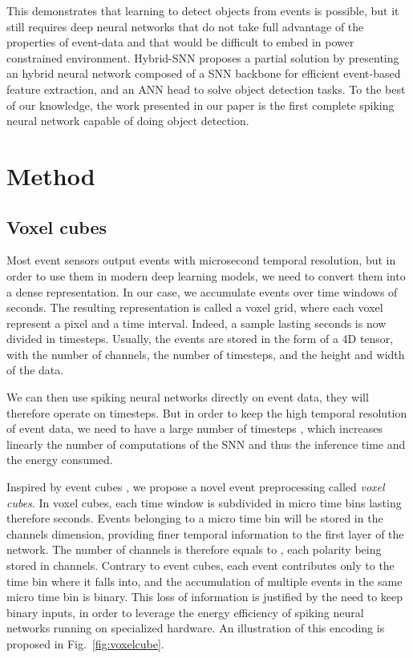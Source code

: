 \documentclass[conference]{IEEEtran}
\begin{document}
This demonstrates that learning to detect objects from events is possible, but it still requires deep neural networks that do not take full advantage of the properties of event-data and that would be difficult to embed in power constrained environment. Hybrid-SNN \cite{hybridsnn} proposes a partial solution by presenting an hybrid neural network composed of a SNN backbone for efficient event-based feature extraction, and an ANN head to solve object detection tasks. To the best of our knowledge, the work presented in our paper is the first complete spiking neural network capable of doing object detection.

\section{Method}

\subsection{Voxel cubes}

Most event sensors output events with  microsecond temporal resolution, but in order to use them in modern deep learning models, we need to convert them into a dense representation. In our case, we accumulate events over time windows of  seconds. The resulting representation is called a voxel grid, where each voxel represent a pixel and a time interval. Indeed, a sample lasting  seconds is now divided in  timesteps. Usually, the events are stored in the form of a 4D  tensor, with  the number of channels,  the number of timesteps,  and  the height and width of the data. 

We can then use spiking neural networks directly on event data, they will therefore operate on  timesteps. But in order to keep the high temporal resolution of event data, we need to have a large number of timesteps , which increases linearly the number of computations of the SNN and thus the inference time and the energy consumed. 

Inspired by event cubes \cite{eventcube}, we propose a novel event preprocessing called \textit{voxel cubes}. In voxel cubes, each time window  is subdivided in  micro time bins lasting therefore  seconds. Events belonging to a micro time bin will be stored in the channels dimension, providing finer temporal information to the first layer of the network. The number of channels  is therefore equals to , each polarity being stored in  channels. Contrary to event cubes, each event contributes only to the time bin where it falls into, and the accumulation of multiple events in the same micro time bin is binary. This loss of information is justified by the need to keep binary inputs, in order to leverage the energy efficiency of spiking neural networks running on specialized hardware. An illustration of this encoding is proposed in Fig.~\ref{fig:voxelcube}.
\end{document}
